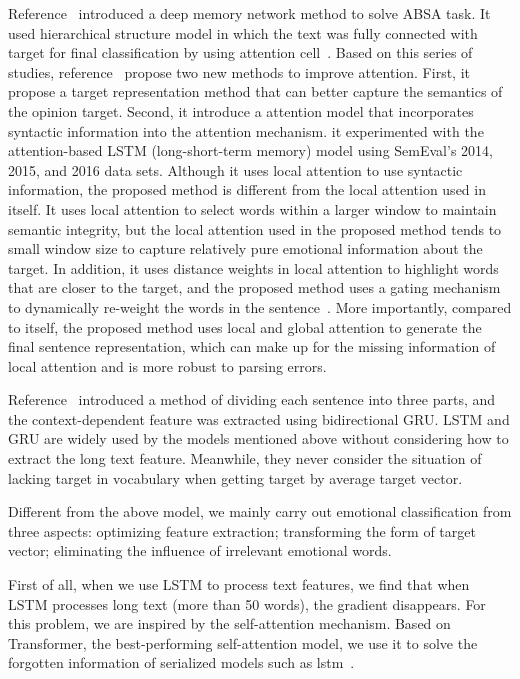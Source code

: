 \documentclass{ieeeaccess}
\begin{document}
Reference~\cite{DBLP:conf/emnlp/TangQL16} introduced a deep memory network method to solve ABSA task. It used hierarchical structure model in which the text was fully connected with target for final classification by using attention cell~\cite{DBLP:conf/cikm/ChengZZKZW17}. Based on this series of studies, reference~\cite{DBLP:conf/coling/HeLND18} propose two new methods to improve attention. First, it propose a target representation method that can better capture the semantics of the opinion target. Second, it introduce a attention model that incorporates syntactic information into the attention mechanism. it experimented with the attention-based LSTM (long-short-term memory) model using SemEval's 2014, 2015, and 2016 data sets. Although it uses local attention to use syntactic information, the proposed method is different from the local attention used in itself. It uses local attention to select words within a larger window to maintain semantic integrity, but the local attention used in the proposed method tends to small window size to capture relatively pure emotional information about the target. In addition, it uses distance weights in local attention to highlight words that are closer to the target, and the proposed method uses a gating mechanism to dynamically re-weight the words in the sentence~\cite{song2018parallel}. More importantly, compared to itself, the proposed method uses local and global attention to generate the final sentence representation, which can make up for the missing information of local attention and is more robust to parsing errors.

Reference~\cite{DBLP:journals/corr/abs-1802-00892} introduced a method of dividing each sentence into three parts, and the context-dependent feature was extracted using bidirectional GRU. LSTM and GRU are widely used by the models mentioned above without considering how to extract the long text feature. Meanwhile, they never consider the situation of lacking target in vocabulary when getting target by average target vector.

Different from the above model, we mainly carry out emotional classification from three aspects: optimizing feature extraction; transforming the form of target vector; eliminating the influence of irrelevant emotional words.

First of all, when we use LSTM to process text features, we find that when LSTM processes long text (more than 50 words), the gradient disappears. For this problem, we are inspired by the self-attention mechanism. Based on Transformer, the best-performing self-attention model, we use it to solve the forgotten information of serialized models such as lstm~\cite{cui2019research}. 
\end{document}
